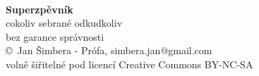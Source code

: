 \sffamily
~
\begin{center}
\Huge{}\textbf{Superzpěvník}\normalsize\\[5ex]
cokoliv sebrané odkudkoliv\\[1ex]
bez garance správnosti\\[1.5ex]
\copyright~Jan Šimbera - Prófa, simbera.jan@gmail.com\\[1.5ex]
volně šiřitelné pod licencí Creative Commons BY-NC-SA
\normalfont
\end{center}
\rmfamily
\newpage
